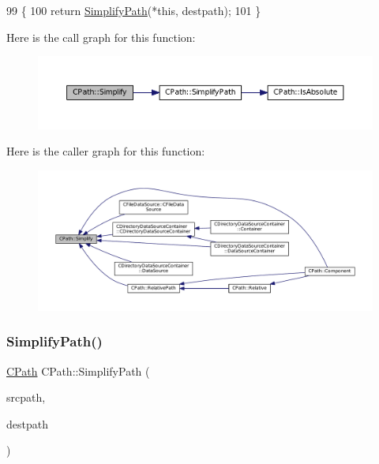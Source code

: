 \begin{DoxyCode}
99                                                 \{
100     \textcolor{keywordflow}{return} \hyperlink{classCPath_af0213a2ea0de0498ded236137e759922}{SimplifyPath}(*\textcolor{keyword}{this}, destpath);
101 \}
\end{DoxyCode}
Here is the call graph for this function\+:
\nopagebreak
\begin{figure}[H]
\begin{center}
\leavevmode
\includegraphics[width=350pt]{classCPath_aa52dcb50c943a8abc8883db5ec43a45e_cgraph}
\end{center}
\end{figure}
Here is the caller graph for this function\+:
\nopagebreak
\begin{figure}[H]
\begin{center}
\leavevmode
\includegraphics[width=350pt]{classCPath_aa52dcb50c943a8abc8883db5ec43a45e_icgraph}
\end{center}
\end{figure}
\hypertarget{classCPath_af0213a2ea0de0498ded236137e759922}{}\label{classCPath_af0213a2ea0de0498ded236137e759922} 
\subsubsection{\texorpdfstring{Simplify\+Path()}{SimplifyPath()}}
{\footnotesize\ttfamily \hyperlink{classCPath}{C\+Path} C\+Path\+::\+Simplify\+Path (\begin{DoxyParamCaption}\item[{const \hyperlink{classCPath}{C\+Path} \&}]{srcpath,  }\item[{const \hyperlink{classCPath}{C\+Path} \&}]{destpath }\end{DoxyParamCaption})\hspace{0.3cm}{\ttfamily [static]}}



